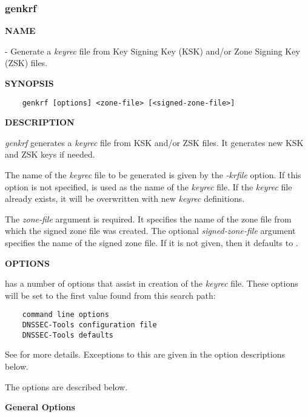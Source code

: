 \clearpage

\subsubsection{\bf genkrf}

{\bf NAME}

 - Generate a {\it keyrec} file from Key Signing Key (KSK)
and/or Zone Signing Key (ZSK) files.

{\bf SYNOPSIS}

\begin{verbatim}
    genkrf [options] <zone-file> [<signed-zone-file>]
\end{verbatim}

{\bf DESCRIPTION}

{\it genkrf} generates a {\it keyrec} file from KSK and/or ZSK files.  It
generates new KSK and ZSK keys if needed.

The name of the {\it keyrec} file to be generated is given by the
{\it -krfile} option.  If this option is not specified, 
is used as the name of the {\it keyrec} file.  If the {\it keyrec} file
already exists, it will be overwritten with new {\it keyrec} definitions.

The {\it zone-file} argument is required.  It specifies the name of the
zone file from which the signed zone file was created.  The optional
{\it signed-zone-file} argument specifies the name of the signed zone file.
If it is not given, then it defaults to .

{\bf OPTIONS}

 has a number of options that assist in creation of the {\it
keyrec} file.  These options will be set to the first value found from this
search path:

\begin{verbatim}
    command line options
    DNSSEC-Tools configuration file
    DNSSEC-Tools defaults
\end{verbatim}

See  for more details.
Exceptions to this are given in the option descriptions below.

The  options are described below.

{\bf General  Options}

